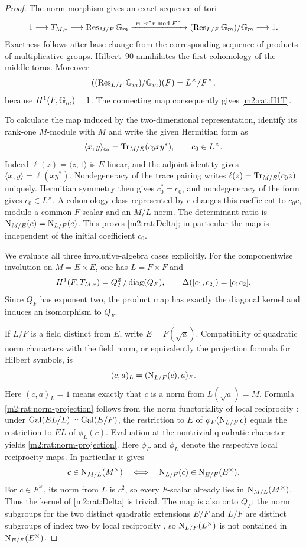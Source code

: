 \begin{proof}
The norm morphism gives an exact sequence of tori
\[
 1\longrightarrow T_{M,*}
 \longrightarrow\operatorname{Res}_{M/F}\mathbb G_m
 \xrightarrow{\ r\mapsto r^*r\bmod F^\times\ }
 (\operatorname{Res}_{L/F}\mathbb G_m)/\mathbb G_m\longrightarrow1.
\]
Exactness follows after base change from the corresponding
sequence of products of multiplicative groups. Hilbert~90
annihilates the first cohomology of the middle torus.
Moreover
\[
 ((\operatorname{Res}_{L/F}\mathbb G_m)/\mathbb G_m)(F)=L^\times/F^\times,
\]
because $H^1(F,\mathbb G_m)=1$.  The connecting map consequently gives
\eqref{m2:rat:H1T}.

To calculate the map induced by the two-dimensional
representation, identify its rank-one $M$-module with $M$
and write the given Hermitian form as
\[
 \langle x,y\rangle_{c_0}
   =\operatorname{Tr}_{M/E}(c_0xy^*),\qquad c_0\in L^\times.
\]
Indeed $\ell(z)=\langle z,1\rangle$ is $E$-linear, and
the adjoint identity gives
$\langle x,y\rangle=\ell(xy^*)$. Nondegeneracy of the
trace pairing writes $\ell(z)=\operatorname{Tr}_{M/E}(c_0z)$ uniquely.
Hermitian symmetry then gives $c_0^*=c_0$, and
nondegeneracy of the form gives $c_0\in L^\times$.
A cohomology class represented by
$c$ changes this coefficient to $c_0c$, modulo a common
$F$-scalar and an $M/L$ norm.  The determinant ratio is
$\operatorname{N}_{M/E}(c)=\operatorname{N}_{L/F}(c)$.  This proves
\eqref{m2:rat:Delta}; in particular the map is independent of
the initial coefficient $c_0$.

We evaluate all three involutive-algebra cases explicitly.
For the componentwise involution on $M=E\times E$, one has
$L=F\times F$ and
\[
 H^1(F,T_{M,*})=Q_F^2/\operatorname{diag}(Q_F),\qquad
 \Delta([c_1,c_2])=[c_1c_2].
\]
Since $Q_F$ has exponent two, the product map has exactly the
diagonal kernel and induces an isomorphism to $Q_F$.

If $L/F$ is a field distinct from $E$, write
$E=F(\sqrt a)$.  Compatibility of quadratic norm characters
with the field norm, or equivalently the projection formula
for Hilbert symbols, is
\begin{equation}\label{m2:rat:norm-projection}
 (c,a)_L=(\operatorname{N}_{L/F}(c),a)_F.
\end{equation}
Here $(c,a)_L=1$ means exactly that $c$ is a norm from
$L(\sqrt a)=M$.  Formula \eqref{m2:rat:norm-projection} follows
from the norm functoriality of local reciprocity
\cite[Proposition~4.3.11]{KedlayaCFT}: under
$\operatorname{Gal}(EL/L)\simeq\operatorname{Gal}(E/F)$, the restriction to $E$
of $\phi_F(\operatorname{N}_{L/F}c)$ equals the restriction to
$EL$ of $\phi_L(c)$.  Evaluation at the nontrivial
quadratic character yields \eqref{m2:rat:norm-projection}.
Here $\phi_F$ and $\phi_L$ denote the respective
local reciprocity maps.
In particular it gives
\[
 c\in\operatorname{N}_{M/L}(M^\times)
 \quad\Longleftrightarrow\quad
 \operatorname{N}_{L/F}(c)\in\operatorname{N}_{E/F}(E^\times).
\]
For $c\in F^\times$, its norm from $L$ is $c^2$, so every
$F$-scalar already lies in $\operatorname{N}_{M/L}(M^\times)$.  Thus the
kernel of \eqref{m2:rat:Delta} is trivial.  The map is also
onto $Q_F$: the norm subgroups for the two distinct quadratic
extensions $E/F$ and $L/F$ are distinct subgroups of index
two by local reciprocity
\cite[Theorem~4.1.2]{KedlayaCFT}, so
$\operatorname{N}_{L/F}(L^\times)$ is not contained in
$\operatorname{N}_{E/F}(E^\times)$.


\end{proof}

